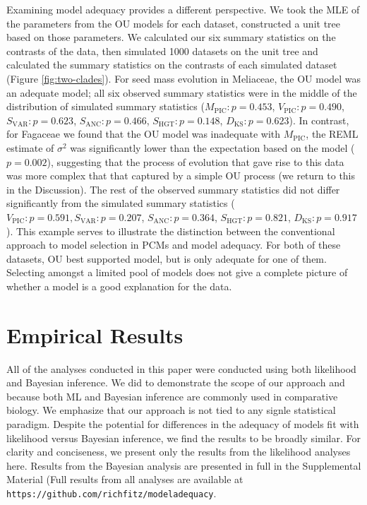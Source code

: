 \documentclass[a4paper,12pt]{article}
\begin{document}
Examining model adequacy provides a different perspective. We took the MLE of the parameters from the OU models for each dataset, constructed a unit tree based on those parameters. We calculated our six summary statistics on the contrasts of the data, then simulated 1000 datasets on the unit tree and calculated the summary statistics on the contrasts of each simulated dataset (Figure \ref{fig:two-clades}). For seed mass evolution in Meliaceae, the OU model was an adequate model; all six observed summary statistics were in the middle of the distribution of simulated summary statistics ($M_{\text{PIC}}: p=0.453$, $V_{\text{PIC}}: p=0.490$, $S_{\text{VAR}}: p=0.623$, $S_{\text{ANC}}:p=0.466$, $S_{\text{HGT}}: p=0.148$, $D_{\text{KS}}: p=0.623$). In contrast, for Fagaceae we found that the OU model was inadequate with $M_{\text{PIC}}$, the REML estimate of $\sigma^2$ was significantly lower than the expectation based on the model ($p=0.002$), suggesting that the process of evolution that gave rise to this data was more complex that that captured by a simple OU process (we return to this in the Discussion).  The rest of the observed summary statistics did not differ significantly from the simulated summary statistics ($V_{\text{PIC}}:p=0.591, S_{\text{VAR}}: p=0.207$, $S_{\text{ANC}}:p=0.364$, $S_{\text{HGT}}: p=0.821$, $D_{\text{KS}}: p=0.917$). This example serves to illustrate the distinction between the conventional approach to model selection in PCMs and model adequacy. For both of these datasets, OU best supported model, but is only adequate for one of them. Selecting amongst a limited pool of models does not give a complete picture of whether a model is a good explanation for the data.


\section{Empirical Results}

All of the analyses conducted in this paper were conducted using both likelihood and Bayesian inference. We did to demonstrate the scope of our approach and because both ML and Bayesian inference are commonly used in comparative biology. We emphasize that our approach is not tied to any signle statistical paradigm.
Despite the potential for differences in the adequacy of models fit with likelihood versus Bayesian inference, we find the results to be broadly similar. For clarity and conciseness, we present only the results from the likelihood analyses here. Results from the Bayesian analysis are presented in full in the Supplemental Material (Full results from all analyses are available at \texttt{https://github.com/richfitz/modeladequacy}. 
\end{document}
